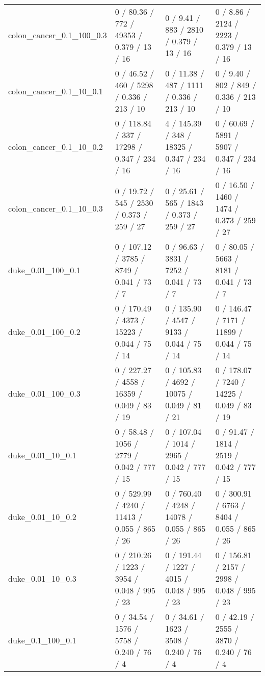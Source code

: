 \begin{tabular}{llll}
  colon\_cancer\_0.1\_100\_0.3 &     0 / 80.36 /    772 /   49353 / 0.379 /     13 /     16 &      0 / 9.41 /    883 /    2810 / 0.379 /     13 /     16 &      0 / 8.86 /   2124 /    2223 / 0.379 /     13 /     16 \\
   colon\_cancer\_0.1\_10\_0.1 &     0 / 46.52 /    460 /    5298 / 0.336 /    213 /     10 &     0 / 11.38 /    487 /    1111 / 0.336 /    213 /     10 &      0 / 9.40 /    802 /     849 / 0.336 /    213 /     10 \\
   colon\_cancer\_0.1\_10\_0.2 &    0 / 118.84 /    337 /   17298 / 0.347 /    234 /     16 &    4 / 145.39 /    348 /   18325 / 0.347 /    234 /     16 &     0 / 60.69 /   5891 /    5907 / 0.347 /    234 /     16 \\
   colon\_cancer\_0.1\_10\_0.3 &     0 / 19.72 /    545 /    2530 / 0.373 /    259 /     27 &     0 / 25.61 /    565 /    1843 / 0.373 /    259 /     27 &     0 / 16.50 /   1460 /    1474 / 0.373 /    259 /     27 \\
         duke\_0.01\_100\_0.1 &    0 / 107.12 /   3785 /    8749 / 0.041 /     73 /      7 &     0 / 96.63 /   3831 /    7252 / 0.041 /     73 /      7 &     0 / 80.05 /   5663 /    8181 / 0.041 /     73 /      7 \\
         duke\_0.01\_100\_0.2 &    0 / 170.49 /   4373 /   15223 / 0.044 /     75 /     14 &    0 / 135.90 /   4547 /    9133 / 0.044 /     75 /     14 &    0 / 146.47 /   7171 /   11899 / 0.044 /     75 /     14 \\
         duke\_0.01\_100\_0.3 &    0 / 227.27 /   4558 /   16359 / 0.049 /     83 /     19 &    0 / 105.83 /   4692 /   10075 / 0.049 /     81 /     21 &    0 / 178.07 /   7240 /   14225 / 0.049 /     83 /     19 \\
          duke\_0.01\_10\_0.1 &     0 / 58.48 /   1056 /    2779 / 0.042 /    777 /     15 &    0 / 107.04 /   1014 /    2965 / 0.042 /    777 /     15 &     0 / 91.47 /   1814 /    2519 / 0.042 /    777 /     15 \\
          duke\_0.01\_10\_0.2 &    0 / 529.99 /   4240 /   11413 / 0.055 /    865 /     26 &    0 / 760.40 /   4248 /   14078 / 0.055 /    865 /     26 &    0 / 300.91 /   6763 /    8404 / 0.055 /    865 /     26 \\
          duke\_0.01\_10\_0.3 &    0 / 210.26 /   1223 /    3954 / 0.048 /    995 /     23 &    0 / 191.44 /   1227 /    4015 / 0.048 /    995 /     23 &    0 / 156.81 /   2157 /    2998 / 0.048 /    995 /     23 \\
          duke\_0.1\_100\_0.1 &     0 / 34.54 /   1576 /    5758 / 0.240 /     76 /      4 &     0 / 34.61 /   1623 /    3508 / 0.240 /     76 /      4 &     0 / 42.19 /   2555 /    3870 / 0.240 /     76 /      4 \\

\end{tabular}
